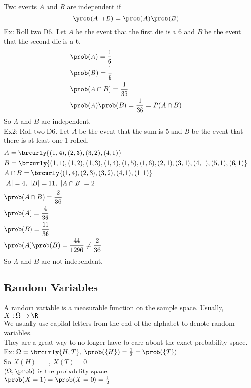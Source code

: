 Two events $A$ and $B$ are independent if
\[\prob(A\cap B)=\prob(A)\prob(B)\]
Ex: Roll two D6. Let $A$ be the event that the first die is a 6 and $B$ be the event that the second die is a 6.
\begin{align*}
    &\prob(A)=\frac{1}{6}\\
    &\prob(B)=\frac{1}{6}\\
    &\prob(A\cap B)=\frac{1}{36}\\
    &\prob(A)\prob(B)=\frac{1}{36}=P(A\cap B)
\end{align*}
So $A$ and $B$ are independent.\\
Ex2: Roll two D6. Let $A$ be the event that the sum is 5 and $B$ be the event that there is at least one 1 rolled.
\begin{align*}
    &A=\brcurly{(1,4),(2,3),(3,2),(4,1)}\\
    &B=\brcurly{(1,1),(1,2),(1,3),(1,4),(1,5),(1,6),(2,1),(3,1),(4,1),(5,1),(6,1)}\\
    &A\cap B=\brcurly{(1,4),(2,3),(3,2),(4,1),(1,1)}\\
    &|A|=4,\ |B|=11,\ |A\cap B|=2\\
    &\prob(A\cap B)=\frac{2}{36}\\
    &\prob(A)=\frac{4}{36}\\
    &\prob(B)=\frac{11}{36}\\
    &\prob(A)\prob(B)=\frac{44}{1296}\neq\frac{2}{36}
\end{align*}
So $A$ and $B$ are not independent.

\subsection{Random Variables}
A random variable is a measurable function on the sample space. Usually, $X:\Omega\to\R$\\
We usually use capital letters from the end of the alphabet to denote random variables.\\
They are a great way to no longer have to care about the exact probability space.\\
Ex: $\Omega=\brcurly{H,T}$, $\prob(\{H\})=\frac{1}{2}=\prob(\{T\})$\\
So $X(H)=1$, $X(T)=0$\\
$(\Omega,\prob)$ is the probability space.\\
$\prob(X=1)=\prob(X=0)=\frac{1}{2}$

